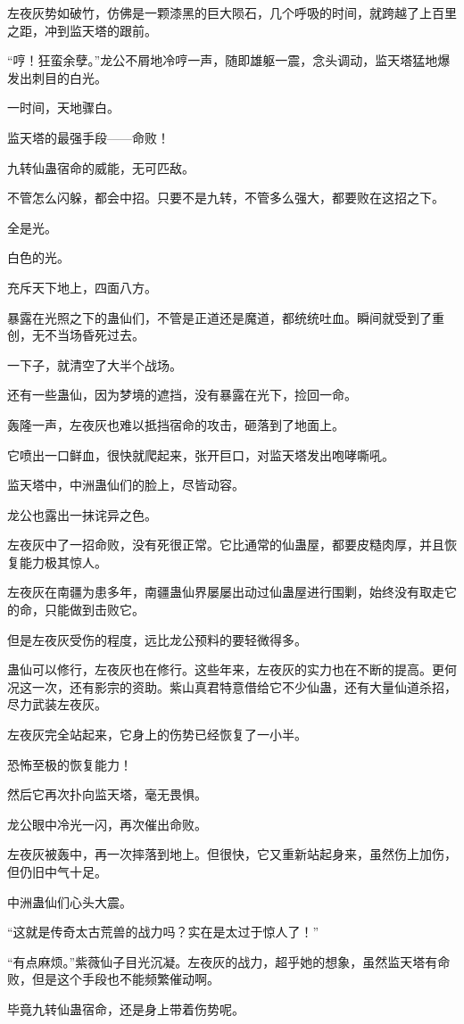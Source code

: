 \begin{this_body}
左夜灰势如破竹，仿佛是一颗漆黑的巨大陨石，几个呼吸的时间，就跨越了上百里之距，冲到监天塔的跟前。

“哼！狂蛮余孽。”龙公不屑地冷哼一声，随即雄躯一震，念头调动，监天塔猛地爆发出刺目的白光。

一时间，天地骤白。

监天塔的最强手段——命败！

九转仙蛊宿命的威能，无可匹敌。

不管怎么闪躲，都会中招。只要不是九转，不管多么强大，都要败在这招之下。

全是光。

白色的光。

充斥天下地上，四面八方。

暴露在光照之下的蛊仙们，不管是正道还是魔道，都统统吐血。瞬间就受到了重创，无不当场昏死过去。

一下子，就清空了大半个战场。

还有一些蛊仙，因为梦境的遮挡，没有暴露在光下，捡回一命。

轰隆一声，左夜灰也难以抵挡宿命的攻击，砸落到了地面上。

它喷出一口鲜血，很快就爬起来，张开巨口，对监天塔发出咆哮嘶吼。

监天塔中，中洲蛊仙们的脸上，尽皆动容。

龙公也露出一抹诧异之色。

左夜灰中了一招命败，没有死很正常。它比通常的仙蛊屋，都要皮糙肉厚，并且恢复能力极其惊人。

左夜灰在南疆为患多年，南疆蛊仙界屡屡出动过仙蛊屋进行围剿，始终没有取走它的命，只能做到击败它。

但是左夜灰受伤的程度，远比龙公预料的要轻微得多。

蛊仙可以修行，左夜灰也在修行。这些年来，左夜灰的实力也在不断的提高。更何况这一次，还有影宗的资助。紫山真君特意借给它不少仙蛊，还有大量仙道杀招，尽力武装左夜灰。

左夜灰完全站起来，它身上的伤势已经恢复了一小半。

恐怖至极的恢复能力！

然后它再次扑向监天塔，毫无畏惧。

龙公眼中冷光一闪，再次催出命败。

左夜灰被轰中，再一次摔落到地上。但很快，它又重新站起身来，虽然伤上加伤，但仍旧中气十足。

中洲蛊仙们心头大震。

“这就是传奇太古荒兽的战力吗？实在是太过于惊人了！”

“有点麻烦。”紫薇仙子目光沉凝。左夜灰的战力，超乎她的想象，虽然监天塔有命败，但是这个手段也不能频繁催动啊。

毕竟九转仙蛊宿命，还是身上带着伤势呢。

\end{this_body}

